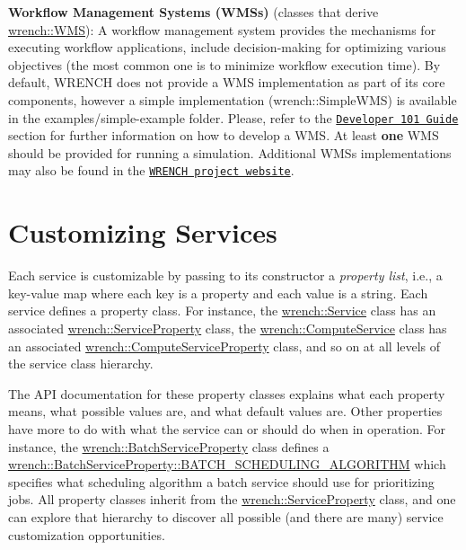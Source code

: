 \begin{DoxyItemize}
\item {\bfseries Workflow Management Systems (W\+M\+Ss)} (classes that derive {\ttfamily \hyperlink{classwrench_1_1_w_m_s}{wrench\+::\+W\+MS}})\+: A workflow management system provides the mechanisms for executing workflow applications, include decision-\/making for optimizing various objectives (the most common one is to minimize workflow execution time). By default, W\+R\+E\+N\+CH does not provide a W\+MS implementation as part of its core components, however a simple implementation ({\ttfamily wrench\+::\+Simple\+W\+MS}) is available in the {\ttfamily examples/simple-\/example} folder. Please, refer to the \href{../developer/wrench-101.html}{\tt Developer 101 Guide} section for further information on how to develop a W\+MS. At least {\bfseries one} W\+MS should be provided for running a simulation. Additional W\+M\+Ss implementations may also be found in the \href{http://wrench-project.org}{\tt W\+R\+E\+N\+CH project website}.
\end{DoxyItemize}\hypertarget{wrench-101_wrench-101-customizing-services}{}\section{Customizing Services}\label{wrench-101_wrench-101-customizing-services}
Each service is customizable by passing to its constructor a {\itshape property list}, i.\+e., a key-\/value map where each key is a property and each value is a string. Each service defines a property class. For instance, the {\ttfamily \hyperlink{classwrench_1_1_service}{wrench\+::\+Service}} class has an associated {\ttfamily \hyperlink{classwrench_1_1_service_property}{wrench\+::\+Service\+Property}} class, the {\ttfamily \hyperlink{classwrench_1_1_compute_service}{wrench\+::\+Compute\+Service}} class has an associated {\ttfamily \hyperlink{classwrench_1_1_compute_service_property}{wrench\+::\+Compute\+Service\+Property}} class, and so on at all levels of the service class hierarchy.

The A\+PI documentation for these property classes explains what each property means, what possible values are, and what default values are. Other properties have more to do with what the service can or should do when in operation. For instance, the {\ttfamily \hyperlink{classwrench_1_1_batch_service_property}{wrench\+::\+Batch\+Service\+Property}} class defines a {\ttfamily \hyperlink{classwrench_1_1_batch_service_property_aceb0af1c33f5ff2da347f54a484ce32e}{wrench\+::\+Batch\+Service\+Property\+::\+B\+A\+T\+C\+H\+\_\+\+S\+C\+H\+E\+D\+U\+L\+I\+N\+G\+\_\+\+A\+L\+G\+O\+R\+I\+T\+HM}} which specifies what scheduling algorithm a batch service should use for prioritizing jobs. All property classes inherit from the {\ttfamily \hyperlink{classwrench_1_1_service_property}{wrench\+::\+Service\+Property}} class, and one can explore that hierarchy to discover all possible (and there are many) service customization opportunities.

